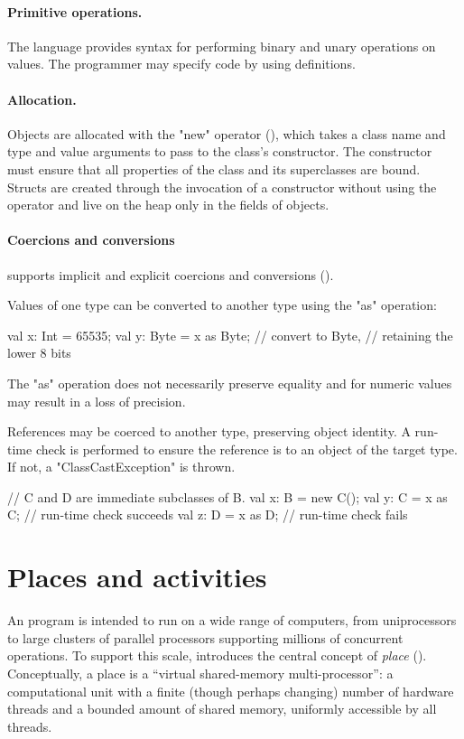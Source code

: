 \paragraph{Primitive operations.}  The language provides syntax for performing
binary and unary operations on values. The programmer may specify code
by using  definitions.


\paragraph{Allocation.}
Objects are allocated with the \xcd"new" operator
(), which takes a class name and type and value
arguments to pass to the class's constructor.  The constructor must
ensure that all properties of the class and its superclasses are
bound. Structs are created through the invocation of a constructor
without using the  operator and live on the heap only in
the fields of objects.

\paragraph{Coercions and conversions}
\Xten{} supports implicit and explicit coercions and
conversions ().

Values of one type can be converted to another type using the
\xcd"as" operation:
\begin{xten}
val x: Int = 65535;
val y: Byte = x as Byte; // convert to Byte,
                         // retaining the lower 8 bits
\end{xten}
The \xcd"as" operation does not necessarily preserve equality
and for numeric values may
result in a loss of precision.

References may be coerced to another type, preserving object
identity.  A run-time check is performed to ensure the reference
is to an object of the target type.  If not,
a \xcd"ClassCastException" is thrown.
\begin{xten}
// C and D are immediate subclasses of B.
val x: B = new C();
val y: C = x as C; // run-time check succeeds
val z: D = x as D; // run-time check fails
\end{xten}

\section{Places and activities}
An \Xten{} program is intended to run on a wide range of computers,
from uniprocessors to large clusters of parallel processors supporting
millions of concurrent operations. To support this scale, \Xten{}
introduces the central concept of \emph{place} ().
Conceptually, a place is a ``virtual shared-memory multi-processor'':
a computational unit with a finite (though perhaps changing) number of
hardware threads and a bounded amount of shared memory, uniformly
accessible by all threads.

